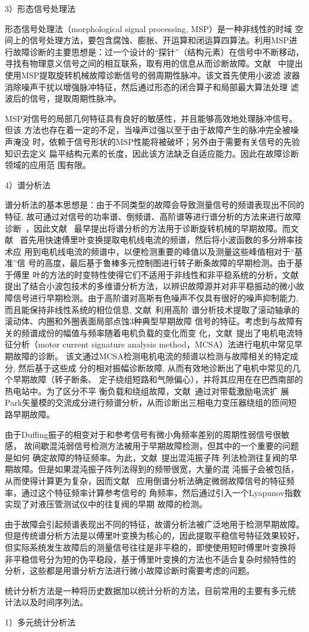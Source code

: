 3）形态信号处理法

形态信号处理法（morphological signal processing, MSP）是一种非线性的时域
空间上的信号处理方法，要包含腐蚀、膨胀、开运算和闭运算四算法。利用MSP进
行故障诊断的主要思想是：过一个设计的“探针”（结构元素）在信号中不断移动，
寻找有物理意义信号之间的相互联系，取有用的信息从而诊断故障。文献~
中提出使用MSP提取旋转机械故障诊断信号的弱周期性脉冲。该文首先使用小波滤
波器消除噪声干扰以增强脉冲特征，然后通过形态的闭合算子和局部最大算法处理
滤波后的信号，提取周期性脉冲。

MSP对信号的局部几何特征具有良好的敏感性，并且能够高效地处理脉冲信号。但该
方法也存在着一定的不足，当噪声过强以至于由于故障产生的脉冲完全被噪声淹没
时，依赖于信号形状的MSP性能将被破坏；另外由于需要有关信号的先验知识去定义
扁平结构元素的长度，因此该方法缺乏自适应能力。因此在故障诊断领域的应用范
围有限。

4）谱分析法

谱分析法的基本思想是：由于不同类型的故障会导致测量信号的频谱表现出不同的
特征, 故可通过对信号的功率谱、倒频谱、高阶谱等进行谱分析的方法来进行故障
诊断~\cite{liuxuexia2008high, yu2005application}，因此文献~
最早提出将谱分析的方法用于诊断旋转机械的早期故障。而文献~
首先用快速傅里叶变换提取电机线电流的频谱，然后将小波函数的多分辨率技术应
用到电机线电流的频谱中，以便检测重要的峰值以及测量这些峰值相对于“基准”信
号的高度，最后基于鲁棒多元控制图进行转子断条故障的早期检测。由于基于傅里
叶的方法的时变特性使得它们不适用于非线性和非平稳系统的分析，文献~
提出了结合小波包技术的多维谱分析方法，以辨识故障源并对非平稳振动的微小故
障信号进行早期检测。由于高阶谱对高斯有色噪声不仅具有很好的噪声抑制能力, 
而且能保持非线性系统的相位信息, 文献~利用高阶
谱分析技术提取了滚动轴承的滚动体、内圈和外圈表面局部点蚀3种典型早期故障
信号的特征。考虑到与故障有关的频谱成份的幅值与频率随着电机负载的变化而变
化，文献~提出了电机电流特征分析（motor 
current signature analysis method，MCSA）法进行电机中常见早期故障的诊断。
该文通过MCSA检测电机电流的频谱以检测与故障相关的特定成分, 然后基于这些成
分的相对振幅诊断故障, 从而有效地诊断出了电机中常见的几个早期故障（转子断条、
定子绕组短路和气隙偏心），并将其应用在在巴西南部的热电站中。为了区分不平
衡负载和绕组故障，文献~通过对带载激励电流扩
展Park矢量模的交流成分进行频谱分析，从而诊断出三相电力变压器绕组的匝间短
路早期故障。

由于Duffing振子的相变对于和参考信号有微小角频率差别的周期性弱信号很敏感，
故间歇混沌弱信号检测方法被用于早期故障检测，但其中的一个重要的问题是如何
确定故障的特征频率。为此，文献~提出混沌振子阵
列法检测往复阀的早期故障。但是如果混沌振子阵列法得到的频带很宽，大量的混
沌振子会被包括，从而使得计算更为复杂，因而文献~
应用倒谱分析法确定微弱故障信号的特征频率，通过这个特征频率计算参考信号的
角频率，然后通过引入一个Lyapunov指数实现了对液压管测试仪中的往复阀的早期
故障的检测。

由于故障会引起频谱表现出不同的特征，故谱分析法被广泛地用于检测早期故障。
但是传统谱分析方法是以傅里叶变换为核心的，因此提取平稳信号特征效果较好，
但实际系统发生故障后的测量信号往往是非平稳的，即使使用短时傅里叶变换将
非平稳信号分为短的伪平稳段，基于傅里叶变换的方法也不适合复杂时频特性的
分析，这些都是用谱分析方法进行微小故障诊断时需要考虑的问题。

统计分析方法是一种将历史数据加以统计分析的方法，目前常用的主要有多元统
计法以及时间序列法。

1）多元统计分析法
